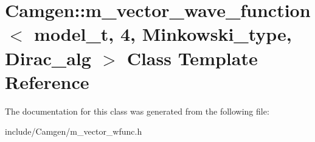 \hypertarget{a00334}{\section{Camgen\-:\-:m\-\_\-vector\-\_\-wave\-\_\-function$<$ model\-\_\-t, 4, Minkowski\-\_\-type, Dirac\-\_\-alg $>$ Class Template Reference}
\label{a00334}
}


The documentation for this class was generated from the following file\-:\begin{DoxyCompactItemize}
\item 
include/\-Camgen/m\-\_\-vector\-\_\-wfunc.\-h\end{DoxyCompactItemize}
